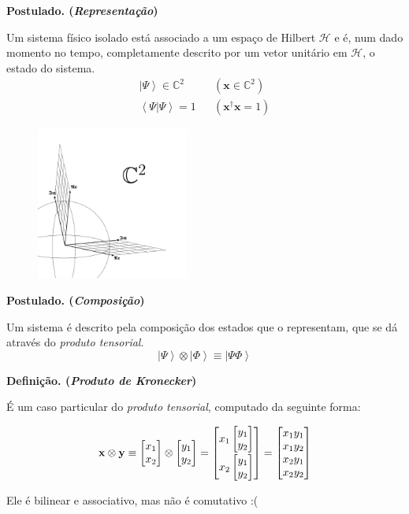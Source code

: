 \documentclass[t]{beamer}
\newcommand{\postulado}[1]{%
	\textbf{Postulado. (\emph{#1})\\}
}
\newcommand{\definicao}[1]{%
	\textbf{Definição. (\emph{#1})\\}
}
\newcommand{\vetor}[2]{\ensuremath{
\left[\begin{matrix}
#1 \\
#2
\end{matrix}\right]
}
}
\newcommand{\vetorx}[4]{\ensuremath{
\left[\begin{matrix}
#1 \\
#2 \\
#3 \\
#4
\end{matrix}\right]
}
}
\newcommand{\ket}[1]{\ensuremath{\left|#1\right\rangle}}
\newcommand{\braket}[2]{\ensuremath{\left\langle#1|#2\right\rangle}}
\begin{document}
	\begin{frame}{\subsecname}
		\postulado{Representação}
		Um sistema físico isolado está associado a um espaço de Hilbert $\mathcal{H}$ e é, num dado momento no tempo, completamente descrito por um vetor unitário em $\mathcal{H}$, o estado do sistema.		
		\begin{align*}
			\ket{\Psi} \in \mathbb{C}^2 && (\mathbf{x} \in \mathbb{C}^2)\\
			\braket{\Psi}{\Psi} = 1 && (\mathbf{x}^{\dagger} \mathbf{x} = 1)
		\end{align*}
		\vspace{-1cm}
		\begin{figure}[H]
			\includegraphics[width=5cm]{c2-sphere.pdf}
		\end{figure}
	\end{frame}

	\begin{frame}{\subsecname}
		\postulado{Composição}
		Um sistema é descrito pela composição dos estados que o representam, que se dá através do \emph{produto tensorial}.
		$$\ket{\Psi} \otimes \ket{\Phi} \equiv \ket{\Psi\Phi}$$
	\end{frame}
	
	\begin{frame}{\subsecname}
		\definicao{Produto de Kronecker}
		
		É um caso particular do \emph{produto tensorial}, computado da seguinte forma:
		
		\begin{align*}
		\mathbf{x} \otimes \mathbf{y} \equiv \vetor{x_1}{x_2} \otimes \vetor{y_1}{y_2} = \vetor{x_1 \vetor{y_1}{y_2} \vspace{2pt}}{x_2 \vetor{y_1}{y_2}} = \vetorx{x_1 y_1}{x_1 y_2}{x_2 y_1 }{x_2 y_2}
		\end{align*}
		
		Ele é bilinear e associativo, mas não é comutativo :(\\
	\end{frame}
	
\end{document}
